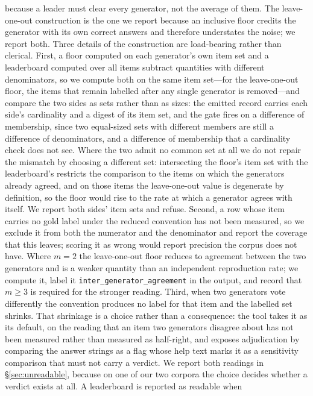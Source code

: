 \documentclass{article}
\begin{document}
\begin{equation}
\end{equation} because a leader must clear every generator, not the average of them. The leave-one-out construction is the one we report because an inclusive floor credits the generator with its own correct answers and therefore understates the noise; we report both. Three details of the construction are load-bearing rather than clerical. First, a floor computed on each generator's own item set and a leaderboard computed over all items subtract quantities with different denominators, so we compute both on the same item set---for the leave-one-out floor, the items that remain labelled after any single generator is removed---and compare the two sides as sets rather than as sizes: the emitted record carries each side's cardinality and a digest of its item set, and the gate fires on a difference of membership, since two equal-sized sets with different members are still a difference of denominators, and a difference of membership that a cardinality check does not see. Where the two admit no common set at all we do not repair the mismatch by choosing a different set: intersecting the floor's item set with the leaderboard's restricts the comparison to the items on which the generators already agreed, and on those items the leave-one-out value is degenerate by definition, so the floor would rise to the rate at which a generator agrees with itself. We report both sides' item sets and refuse. Second, a row whose item carries no gold label under the reduced convention has not been measured, so we exclude it from both the numerator and the denominator and report the coverage that this leaves; scoring it as wrong would report precision the corpus does not have. Where $m = 2$ the leave-one-out floor reduces to agreement between the two generators and is a weaker quantity than an independent reproduction rate; we compute it, label it \texttt{inter\_generator\_agreement} in the output, and record that $m \geq 3$ is required for the stronger reading. Third, when two generators vote differently the convention produces no label for that item and the labelled set shrinks. That shrinkage is a choice rather than a consequence: the tool takes it as its default, on the reading that an item two generators disagree about has not been measured rather than measured as half-right, and exposes adjudication by comparing the answer strings as a flag whose help text marks it as a sensitivity comparison that must not carry a verdict. We report both readings in \S\ref{sec:unreadable}, because on one of our two corpora the choice decides whether a verdict exists at all. A leaderboard is reported as readable when
\end{document}

